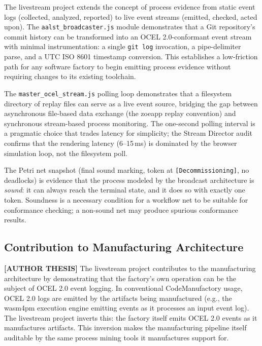 The livestream project extends the concept of process evidence from static event
logs (collected, analyzed, reported) to live event streams (emitted, checked,
acted upon). The \texttt{aalst\_broadcaster.js} module demonstrates that a Git
repository's commit history can be transformed into an OCEL 2.0-conformant event
stream with minimal instrumentation: a single \texttt{git log} invocation,
a pipe-delimiter parse, and a UTC ISO 8601 timestamp conversion. This establishes
a low-friction path for any software factory to begin emitting process evidence
without requiring changes to its existing toolchain.

The \texttt{master\_ocel\_stream.js} polling loop demonstrates that a filesystem
directory of replay files can serve as a live event source, bridging the gap
between asynchronous file-based data exchange (the zoeapp replay convention) and
synchronous stream-based process monitoring. The one-second polling interval is
a pragmatic choice that trades latency for simplicity; the Stream Director audit
confirms that the rendering latency (6--15\,ms) is dominated by the browser
simulation loop, not the filesystem poll.

The Petri net snapshot (final sound marking, token at \texttt{[Decommissioning]},
no deadlocks) is evidence that the process modeled by the broadcast architecture
is \emph{sound}: it can always reach the terminal state, and it does so with
exactly one token. Soundness is a necessary condition for a workflow net to be
suitable for conformance checking; a non-sound net may produce spurious
conformance results.

\subsection{Contribution to Manufacturing Architecture}
\label{sec:livestream-contribution-manufacturing}

\textbf{[AUTHOR THESIS]} The livestream project contributes to the manufacturing
architecture by demonstrating that the factory's own operation can be the subject
of OCEL 2.0 event logging. In conventional CodeManufactory usage, OCEL 2.0 logs
are emitted by the artifacts being manufactured (e.g., the wasm4pm execution engine
emitting events as it processes an input event log). The livestream project inverts
this: the factory itself emits OCEL 2.0 events as it manufactures artifacts. This
inversion makes the manufacturing pipeline itself auditable by the same process
mining tools it manufactures support for.

